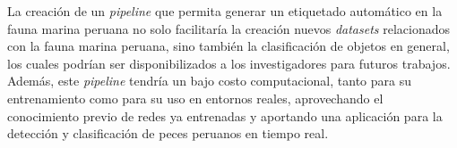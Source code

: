 La creación de un \textit{pipeline} que permita generar un etiquetado 
automático en la fauna marina peruana no solo facilitaría la creación 
nuevos \textit{datasets} relacionados con la fauna marina peruana, sino 
también la clasificación de objetos en general, los cuales 
podrían ser disponibilizados a los investigadores para futuros trabajos. 
Además, este \textit{pipeline} tendría un bajo costo computacional, tanto 
para su entrenamiento como para su uso en entornos reales, aprovechando el 
conocimiento previo de redes ya entrenadas y aportando una aplicación para la 
detección y clasificación de peces peruanos en tiempo real.